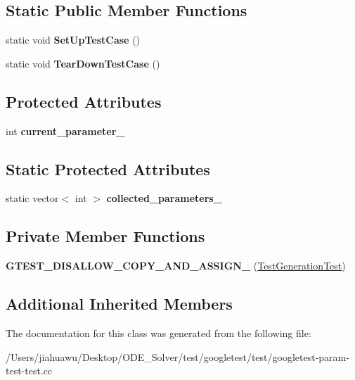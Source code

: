 \subsection*{Static Public Member Functions}
\begin{DoxyCompactItemize}
\item 
\mbox{\label{class_test_generation_test_a3e1681e93e14b17fe923e763d88940cb}} 
static void {\bfseries Set\+Up\+Test\+Case} ()
\item 
\mbox{\label{class_test_generation_test_ab0f077f3b881d66e3676741761222732}} 
static void {\bfseries Tear\+Down\+Test\+Case} ()
\end{DoxyCompactItemize}
\subsection*{Protected Attributes}
\begin{DoxyCompactItemize}
\item 
\mbox{\label{class_test_generation_test_a2d149b987b6dfe86ffbfae677199b0cd}} 
int {\bfseries current\+\_\+parameter\+\_\+}
\end{DoxyCompactItemize}
\subsection*{Static Protected Attributes}
\begin{DoxyCompactItemize}
\item 
\mbox{\label{class_test_generation_test_a16dfa6f4b445c7e4a7a9611b34b7a7a2}} 
static vector$<$ int $>$ {\bfseries collected\+\_\+parameters\+\_\+}
\end{DoxyCompactItemize}
\subsection*{Private Member Functions}
\begin{DoxyCompactItemize}
\item 
\mbox{\label{class_test_generation_test_a896a79483bc30b0e0c39716ab17da8f1}} 
{\bfseries G\+T\+E\+S\+T\+\_\+\+D\+I\+S\+A\+L\+L\+O\+W\+\_\+\+C\+O\+P\+Y\+\_\+\+A\+N\+D\+\_\+\+A\+S\+S\+I\+G\+N\+\_\+} (\mbox{\hyperlink{class_test_generation_test}{Test\+Generation\+Test}})
\end{DoxyCompactItemize}
\subsection*{Additional Inherited Members}


The documentation for this class was generated from the following file\+:\begin{DoxyCompactItemize}
\item 
/\+Users/jiahuawu/\+Desktop/\+O\+D\+E\+\_\+\+Solver/test/googletest/test/googletest-\/param-\/test-\/test.\+cc\end{DoxyCompactItemize}

